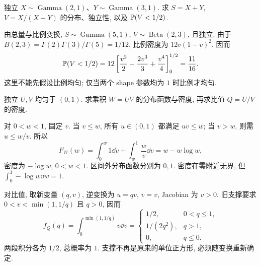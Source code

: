 \begin{exercise}
独立 $X\sim\operatorname{Gamma}(2,1)$、$Y\sim\operatorname{Gamma}(3,1)$. 求 $S=X+Y$, $V=X/(X+Y)$ 的分布、独立性, 以及 $\mathbb P(V<1/2)$.
\end{exercise}
\begin{solution}
由总量与比例变换, $S\sim\operatorname{Gamma}(5,1)$,
$V\sim\operatorname{Beta}(2,3)$, 且独立. 由于
$B(2,3)=\Gamma(2)\Gamma(3)/\Gamma(5)=1/12$, 比例密度为 $12v(1-v)^2$. 因而
\[
 \mathbb P(V<1/2)=12\left[\frac{v^2}{2}-\frac{2v^3}{3}+\frac{v^4}{4}\right]_0^{1/2}
 =\frac{11}{16}.
\]
这里不能先假设比例均匀; 仅当两个 shape 参数均为 $1$ 时比例才均匀.
\end{solution}

\begin{exercise}
独立 $U,V$ 均匀于 $(0,1)$. 求乘积 $W=UV$ 的分布函数与密度, 再求比值 $Q=U/V$ 的密度.
\end{exercise}
\begin{solution}
对 $0<w<1$, 固定 $v$. 当 $v\le w$, 所有 $u\in(0,1)$ 都满足 $uv\le w$; 当 $v>w$, 则需 $u\le w/v$. 所以
\[
 F_W(w)=\int_0^w1\dd v+\int_w^1\frac wv\dd v
 =w-w\log w,
\]
密度为 $-\log w$, $0<w<1$. 区间外分布函数分别为 $0,1$. 密度在零附近无界, 但 $\int_0^1-\log w\dd w=1$.

对比值, 取新变量 $(q,v)$, 逆变换为 $u=qv$, $v=v$, Jacobian 为 $v>0$. 旧支撑要求 $0<v<\min(1,1/q)$ 且 $q>0$, 因而
\[
 f_Q(q)=\int_0^{\min(1,1/q)}v\dd v
 =\begin{cases}1/2,&0<q\le1,\\1/(2q^2),&q>1,\\0,&q\le0.\end{cases}
\]
两段积分各为 $1/2$, 总概率为 $1$. 支撑不再是原来的单位正方形, 必须随变换重新确定.
\end{solution}

